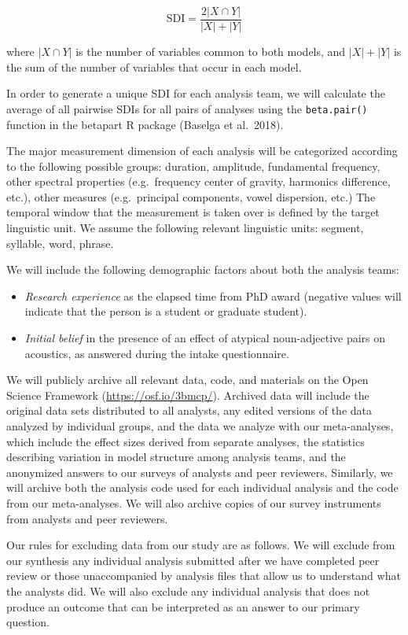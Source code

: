 \documentclass[
  english,
  man,floatsintext]{apa6}
\providecommand{\tightlist}{%
  \setlength{\itemsep}{0pt}\setlength{\parskip}{0pt}}
\begin{document}
\[\text{SDI} = \frac{2|X \cap Y|}{|X|+|Y|}\]

where \(|X \cap Y|\) is the number of variables common to both models, and \(|X|+|Y|\) is the sum of the number of variables that occur in each model.

In order to generate a unique SDI for each analysis team, we will calculate the average of all pairwise SDIs for all pairs of analyses using the \texttt{beta.pair()} function in the betapart R package (Baselga et al.~2018).

The major measurement dimension of each analysis will be categorized according to the following possible groups: duration, amplitude, fundamental frequency, other spectral properties (e.g.~frequency center of gravity, harmonics difference, etc.), other measures (e.g.~principal components, vowel dispersion, etc.)
The temporal window that the measurement is taken over is defined by the target linguistic unit.
We assume the following relevant linguistic units: segment, syllable, word, phrase.

We will include the following demographic factors about both the analysis teams:

\begin{itemize}
\tightlist
\item
  \emph{Research experience} as the elapsed time from PhD award (negative values will indicate that the person is a student or graduate student).
\item
  \emph{Initial belief} in the presence of an effect of atypical noun-adjective pairs on acoustics, as answered during the intake questionnaire.
\end{itemize}

We will publicly archive all relevant data, code, and materials on the Open Science Framework (\url{https://osf.io/3bmcp/}).
Archived data will include the original data sets distributed to all analysts, any edited versions of the data analyzed by individual groups, and the data we analyze with our meta-analyses, which include the effect sizes derived from separate analyses, the statistics describing variation in model structure among analysis teams, and the anonymized answers to our surveys of analysts and peer reviewers.
Similarly, we will archive both the analysis code used for each individual analysis and the code from our meta-analyses.
We will also archive copies of our survey instruments from analysts and peer reviewers.

Our rules for excluding data from our study are as follows.
We will exclude from our synthesis any individual analysis submitted after we have completed peer review or those unaccompanied by analysis files that allow us to understand what the analysts did.
We will also exclude any individual analysis that does not produce an outcome that can be interpreted as an answer to our primary question.
\end{document}
